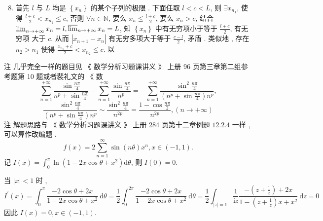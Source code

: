 \documentclass[10pt]{article}
\begin{document}
{\begin{enumerate}
  \setcounter{enumi}{7}
  \item  首先  $l$  与  $L$  均是  $\left\{x_{n}\right\}$  的某个子列的极限 .  下面任取  $l<c<L$,  则  $\exists x_{n_{1}}$,  使得  $\frac{l+c}{2}<x_{n_{1}} \leqslant c$,  否则  $\forall n \in \mathbb{N}$,  要么  $x_{n} \leqslant \frac{l+c}{2}$,  要么  $x_{n}>c$,  结合  $\varliminf_{n \rightarrow+\infty} x_{n}=l, \varlimsup_{n \rightarrow+\infty} x_{n}=L$,  知  $\left\{x_{n}\right\}$  中有无穷项小于等于  $\frac{l+c}{2}$,  有无穷项   大于  $c$.  从而  $\left|x_{n+1}-x_{n}\right|$  有无穷多项大于等于  $\frac{c-l}{2}$,  矛盾 .  类似地 ,  存在  $n_{2}>n_{1}$  使得  $\frac{x_{n_{1}}+c}{2}<x_{n_{2}} \leqslant c$.  以 
\end{enumerate}
 注   几乎完全一样的题目见 《 数学分析习题课讲义 》 上册  96  页第三章第二组参考题第  10  题或者裴礼文的 《 数 
$$
\sum_{n=1}^{+\infty} \frac{\sin \frac{n \pi}{4}}{n^{p}+\sin \frac{n \pi}{4}}-\sum_{n=1}^{+\infty} \frac{\sin \frac{n \pi}{4}}{n^{p}}=-\sum_{n=1}^{+\infty} \frac{\sin ^{2} \frac{n \pi}{4}}{\left(n^{p}+\sin \frac{n \pi}{4}\right) n^{p}},
$$
$$
\frac{\sin ^{2} \frac{n \pi}{4}}{\left(n^{p}+\sin \frac{n \pi}{4}\right) n^{p}} \sim \frac{\sin ^{2} \frac{n \pi}{4}}{n^{2 p}}=\frac{1-\cos \frac{n \pi}{2}}{n^{2 p}},(n \rightarrow+\infty)
$$
 注   解题思路与 《 数学分析习题课讲义 》 上册  284  页第十二章例题  $12.2 .4$  一样 ,  可以算作改编题 .
$$
f(x)=2 \sum_{n=1}^{\infty} \sin (n \theta) x^{n}, x \in(-1,1) .
$$
 记  $I(x)=\int_{0}^{\pi} \ln \left(1-2 x \cos \theta+x^{2}\right) \mathrm{d} \theta$,  则  $I(0)=0$.

 当  $|x|<1$  时 ,
$$
I^{\prime}(x)=\int_{0}^{\pi} \frac{-2 \cos \theta+2 x}{1-2 x \cos \theta+x^{2}} \mathrm{~d} \theta=\frac{1}{2} \int_{0}^{2 \pi} \frac{-2 \cos \theta+2 x}{1-2 x \cos \theta+x^{2}} \mathrm{~d} \theta=\frac{1}{2} \int_{|z|=1} \frac{1}{\mathrm{i} z} \frac{-\left(z+\frac{1}{z}\right)+2 x}{1-\left(z+\frac{1}{z}\right) x+x^{2}} \mathrm{~d} z=0
$$
 因此  $I(x)=0, x \in(-1,1)$.

}
\end{document}

